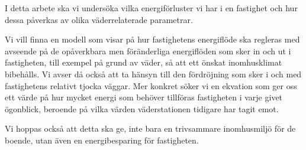 I detta arbete ska vi undersöka vilka energiförluster vi har i en fastighet och hur dessa påverkas av olika väderrelaterade parametrar.

Vi vill finna en modell som visar på hur fastighetens energiflöde ska regleras med avseende på de opåverkbara men föränderliga energiflöden som sker in och ut i fastigheten, till exempel på grund av väder, så att ett önskat inomhusklimat bibehålls. Vi avser då också att ta hänsyn till den fördröjning som sker i och med fastighetens relativt tjocka väggar. Mer konkret söker vi en ekvation som ger oss ett värde på hur mycket energi som behöver tillföras fastigheten i varje givet ögonblick, beroende på vilka värden väderstationen tidigare har tagit emot.

Vi hoppas också att detta ska ge, inte bara en trivsammare inomhusmiljö för de boende, utan även en energibesparing för fastigheten.